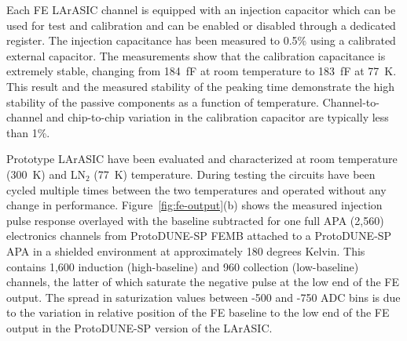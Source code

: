 Each FE LArASIC channel is equipped with an injection capacitor which can be used
for test and calibration and can be enabled or disabled through a
dedicated register. The injection capacitance has been measured to 0.5$\%$ using 
a calibrated external capacitor. The measurements show
that the calibration capacitance is extremely stable, changing from
184~fF at room temperature to 183~fF at 77~K. This result and the measured
stability of the peaking time demonstrate the high stability of the
passive components as a function of temperature. Channel-to-channel and chip-to-chip
variation in the calibration capacitor are typically less than 1\%. 

Prototype LArASIC have been evaluated and characterized at room temperature (300~K) and LN$_2$
(77~K) temperature.
During testing the circuits have been cycled multiple times
between the two temperatures and operated without any change in performance.
Figure~\ref{fig:fe-output}(b) shows the measured injection pulse response overlayed with the baseline subtracted for one full APA 
(2,560) electronics channels from ProtoDUNE-SP FEMB attached to a ProtoDUNE-SP APA in a 
shielded environment at approximately 180 degrees Kelvin. This contains 1,600 induction (high-baseline)
and 960 collection (low-baseline) channels, the latter of which saturate the negative pulse at the low 
end of the FE output. The spread in saturization values between -500 and -750 ADC bins is due to the
variation in relative position of the FE baseline to the low end of the FE output 
in the ProtoDUNE-SP version of the LArASIC.



